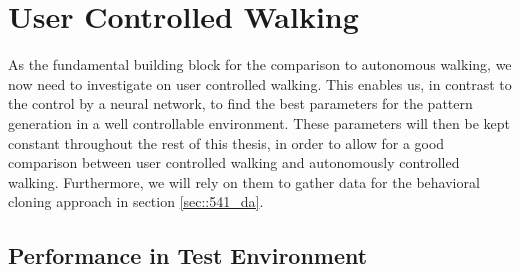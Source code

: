 \section{User Controlled Walking}
\label{sec::53_uc}
As the fundamental building block for the comparison to autonomous walking, we now need to investigate on user controlled walking. This enables us, in contrast to the control by a neural network, to find the best parameters for the pattern generation in a well controllable environment. These parameters will then be kept constant throughout the rest of this thesis, in order to allow for a good comparison between user controlled walking and autonomously controlled walking. Furthermore, we will rely on them to gather data for the behavioral cloning approach in section \ref{sec::541_da}.
\subsection{Performance in Test Environment}
